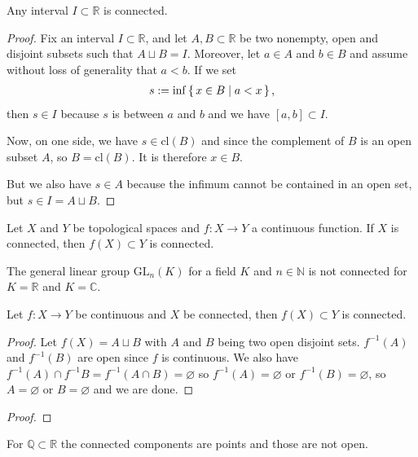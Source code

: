 \begin{thmbox}
    \begin{lemma}
        Any {\color{mathif}interval} \(I \subset \mathbb{R}\) is {\color{maththen}connected}.
    \end{lemma}
\end{thmbox}
%
\begin{proof}
    Fix an interval \(I \subset \mathbb{R}\), and let \(A, B \subset \mathbb{R}\) be two nonempty, open and disjoint subsets such that \(A \sqcup B = I\). Moreover, let \(a \in A\) and \(b \in B\) and assume without loss of generality that \(a < b\). If we set
    \begin{align}
        s := \inf \left\{\, x \in B \mid a < x \,\right\} \text{,}
    \end{align}
    then \(s \in I\) because \(s\) is between \(a\) and \(b\) and we have \([a, b] \subset I\).

    Now, on one side, we have \(s \in \mathrm{cl}(B)\) and since the complement of \(B\) is an open subset \(A\), so \(B = \mathrm{cl}(B)\). It is therefore \(x \in B\).
    
    But we also have \(s \in A\) because the infimum cannot be contained in an open set, but \(s \in I = A \sqcup B\).
\end{proof}
%
\begin{thmbox}
    \begin{lemma}
        Let \(X\) and \(Y\) be {\color{mathif}topological spaces} and \(f: X \longrightarrow Y\) a {\color{mathif}continuous function}. If \(X\) is {\color{mathif}connected}, then \(f(X) \subset Y\) is {\color{maththen}connected}.
    \end{lemma}
\end{thmbox}
%
\begin{example}
    The general linear group \(\mathrm{GL}_n(K)\) for a field \(K\) and \(n \in \mathbb{N}\) is not connected for \(K = \mathbb{R}\) and \(K = \mathbb{C}\).
\end{example}

\begin{remark}
    Let \(f: X \longrightarrow Y\) be continuous and \(X\) be connected, then \(f(X) \subset Y\) is connected.
\end{remark}
\begin{proof}
    Let \(f(X) = A \sqcup B\) with \(A\) and \(B\) being two open disjoint sets. \(f^{-1}(A)\) and \(f^{-1}(B)\) are open since \(f\) is continuous. We also have \(f^{-1}(A) \cap f^{-1}B = f^{-1}(A \cap B) = \varnothing\) so \(f^{-1}(A) = \varnothing\) or \(f^{-1}(B) = \varnothing\), so \(A = \varnothing\) or \(B = \varnothing\) and we are done.
\end{proof}
\begin{proof}
\end{proof}
\begin{example}
    For \(\mathbb{Q} \subset \mathbb{R}\) the connected components are points and those are not open.
\end{example}

